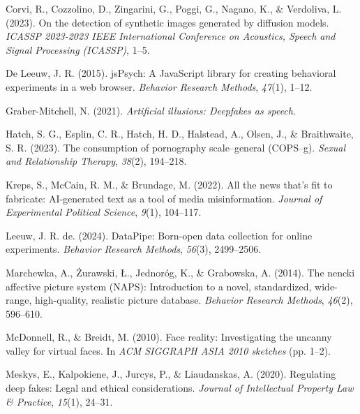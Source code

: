 \documentclass[
  jou,
  floatsintext,
  longtable,
  nolmodern,
  notxfonts,
  notimes,
  colorlinks=true,linkcolor=blue,citecolor=blue,urlcolor=blue]{apa7}
\newlength{\cslhangindent}
\newenvironment{CSLReferences}[2] %
 {\begin{list}{}{%
  \setlength{\itemindent}{0pt}
  \setlength{\leftmargin}{0pt}
  \setlength{\parsep}{0pt}
  \ifodd #1
   \setlength{\leftmargin}{\cslhangindent}
   \setlength{\itemindent}{-1\cslhangindent}
  \fi
  \setlength{\itemsep}{#2\baselineskip}}}
 {\end{list}}
\begin{document}
\label{refs}
\begin{CSLReferences}{1}{0}
Corvi, R., Cozzolino, D., Zingarini, G., Poggi, G., Nagano, K., \&
Verdoliva, L. (2023). On the detection of synthetic images generated by
diffusion models. \emph{ICASSP 2023-2023 IEEE International Conference
on Acoustics, Speech and Signal Processing (ICASSP)}, 1--5.

De Leeuw, J. R. (2015). jsPsych: A JavaScript library for creating
behavioral experiments in a web browser. \emph{Behavior Research
Methods}, \emph{47}(1), 1--12.

Graber-Mitchell, N. (2021). \emph{Artificial illusions: Deepfakes as
speech}.

Hatch, S. G., Esplin, C. R., Hatch, H. D., Halstead, A., Olsen, J., \&
Braithwaite, S. R. (2023). The consumption of pornography scale--general
(COPS--g). \emph{Sexual and Relationship Therapy}, \emph{38}(2),
194--218.

Kreps, S., McCain, R. M., \& Brundage, M. (2022). All the news that's
fit to fabricate: AI-generated text as a tool of media misinformation.
\emph{Journal of Experimental Political Science}, \emph{9}(1), 104--117.

Leeuw, J. R. de. (2024). DataPipe: Born-open data collection for online
experiments. \emph{Behavior Research Methods}, \emph{56}(3), 2499--2506.

Marchewka, A., Żurawski, Ł., Jednoróg, K., \& Grabowska, A. (2014). The
nencki affective picture system (NAPS): Introduction to a novel,
standardized, wide-range, high-quality, realistic picture database.
\emph{Behavior Research Methods}, \emph{46}(2), 596--610.

McDonnell, R., \& Breidt, M. (2010). Face reality: Investigating the
uncanny valley for virtual faces. In \emph{ACM SIGGRAPH ASIA 2010
sketches} (pp. 1--2).

Meskys, E., Kalpokiene, J., Jurcys, P., \& Liaudanskas, A. (2020).
Regulating deep fakes: Legal and ethical considerations. \emph{Journal
of Intellectual Property Law \& Practice}, \emph{15}(1), 24--31.


\end{CSLReferences}
\end{document}
